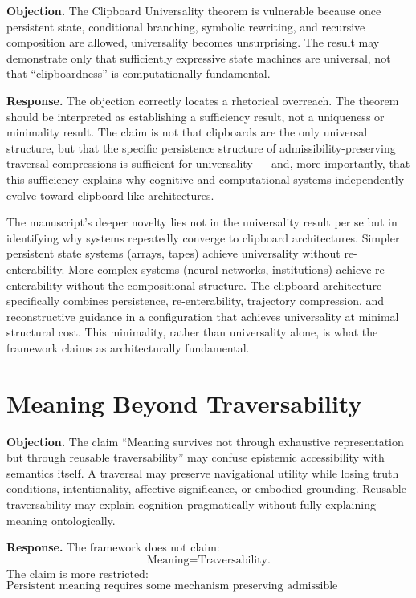 \documentclass[12pt,oneside]{book}
\theoremstyle{plain}
\theoremstyle{definition}
\theoremstyle{plain}
\begin{document}
\textbf{Objection.} The Clipboard Universality theorem is vulnerable because once persistent state, conditional branching, symbolic rewriting, and recursive composition are allowed, universality becomes unsurprising. The result may demonstrate only that sufficiently expressive state machines are universal, not that ``clipboardness'' is computationally fundamental.

\textbf{Response.} The objection correctly locates a rhetorical overreach. The theorem should be interpreted as establishing a sufficiency result, not a uniqueness or minimality result. The claim is not that clipboards are the only universal structure, but that the specific persistence structure of admissibility-preserving traversal compressions is sufficient for universality — and, more importantly, that this sufficiency explains why cognitive and computational systems independently evolve toward clipboard-like architectures.

The manuscript's deeper novelty lies not in the universality result per se but in identifying why systems repeatedly converge to clipboard architectures. Simpler persistent state systems (arrays, tapes) achieve universality without re-enterability. More complex systems (neural networks, institutions) achieve re-enterability without the compositional structure. The clipboard architecture specifically combines persistence, re-enterability, trajectory compression, and reconstructive guidance in a configuration that achieves universality at minimal structural cost. This minimality, rather than universality alone, is what the framework claims as architecturally fundamental.

\section{Meaning Beyond Traversability}

\textbf{Objection.} The claim ``Meaning survives not through exhaustive representation but through reusable traversability'' may confuse epistemic accessibility with semantics itself. A traversal may preserve navigational utility while losing truth conditions, intentionality, affective significance, or embodied grounding. Reusable traversability may explain cognition pragmatically without fully explaining meaning ontologically.

\textbf{Response.} The framework does not claim:
\[
\text{Meaning} = \text{Traversability.}
\]
The claim is more restricted:
\[
\text{Persistent meaning requires some mechanism preserving admissible reconstructability across interruptions.}
\]
\end{document}
